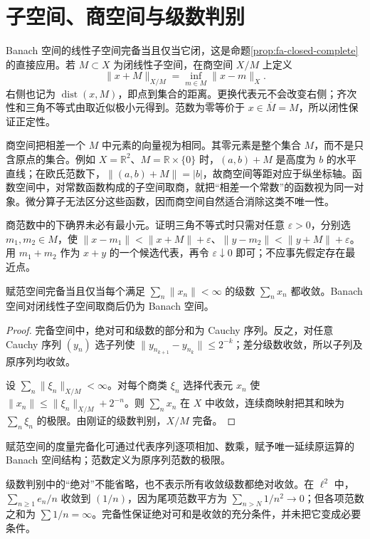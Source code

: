\documentclass[UTF8,12pt,a4paper,fontset=fandol]{ctexbook}
\begin{document}
\section{子空间、商空间与级数判别}
Banach 空间的线性子空间完备当且仅当它闭，这是命题\ref{prop:fa-closed-complete}的直接应用。若 $M\subset X$ 为闭线性子空间，在商空间 $X/M$ 上定义
\begin{equation}
 \|x+M\|_{X/M}=\inf_{m\in M}\|x-m\|_X.
 \label{eq:fa-quotient-norm}
\end{equation}
右侧也记为 $\operatorname{dist}(x,M)$，即点到集合的距离。更换代表元不会改变右侧；齐次性和三角不等式由取近似极小元得到。范数为零等价于 $x\in\overline M=M$，所以闭性保证正定性。

商空间把相差一个 $M$ 中元素的向量视为相同。其零元素是整个集合 $M$，而不是只含原点的集合。例如 $X=\mathbb R^2$、$M=\mathbb R\times\{0\}$ 时，$(a,b)+M$ 是高度为 $b$ 的水平直线；在欧氏范数下，$\|(a,b)+M\|=|b|$，故商空间等距对应于纵坐标轴。函数空间中，对常数函数构成的子空间取商，就把“相差一个常数”的函数视为同一对象。微分算子无法区分这些函数，因而商空间自然适合消除这类不唯一性。

商范数中的下确界未必有最小元。证明三角不等式时只需对任意 $\varepsilon>0$，分别选 $m_1,m_2\in M$，使 $\|x-m_1\|<\|x+M\|+\varepsilon$、$\|y-m_2\|<\|y+M\|+\varepsilon$。用 $m_1+m_2$ 作为 $x+y$ 的一个候选代表，再令 $\varepsilon\downarrow0$ 即可；不应事先假定存在最近点。

\begin{proposition}\label{prop:fa-series-complete}
赋范空间完备当且仅当每个满足 $\sum_n\|x_n\|<\infty$ 的级数 $\sum_nx_n$ 都收敛。Banach 空间对闭线性子空间取商后仍为 Banach 空间。
\end{proposition}
\begin{proof}
完备空间中，绝对可和级数的部分和为 Cauchy 序列。反之，对任意 Cauchy 序列 $(y_n)$ 选子列使 $\|y_{n_{k+1}}-y_{n_k}\|\leq2^{-k}$；差分级数收敛，所以子列及原序列均收敛。

设 $\sum_n\|\xi_n\|_{X/M}<\infty$。对每个商类 $\xi_n$ 选择代表元 $x_n$ 使 $\|x_n\|\leq\|\xi_n\|_{X/M}+2^{-n}$。则 $\sum_nx_n$ 在 $X$ 中收敛，连续商映射把其和映为 $\sum_n\xi_n$ 的极限。由刚证的级数判别，$X/M$ 完备。
\end{proof}
赋范空间的度量完备化可通过代表序列逐项相加、数乘，赋予唯一延续原运算的 Banach 空间结构；范数定义为原序列范数的极限。

级数判别中的“绝对”不能省略，也不表示所有收敛级数都绝对收敛。在 $\ell^2$ 中，$\sum_{n\geq1}e_n/n$ 收敛到 $(1/n)$，因为尾项范数平方为 $\sum_{n>N}1/n^2\to0$；但各项范数之和为 $\sum1/n=\infty$。完备性保证绝对可和是收敛的充分条件，并未把它变成必要条件。
\end{document}
